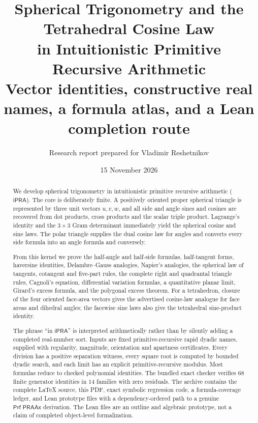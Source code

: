 \documentclass[11pt]{article}
\title{\textbf{Spherical Trigonometry and the Tetrahedral Cosine Law\\
       in Intuitionistic Primitive Recursive Arithmetic}\\[0.4em]
       \large Vector identities, constructive real names, a formula atlas, and a Lean completion route}
\author{Research report prepared for Vladimir Reshetnikov}
\date{15 November 2026}
\theoremstyle{definition}
\newcommand{\ipra}{\mathsf{iPRA}}
\newcommand{\PRAAx}{\mathsf{PRAAx}}
\newcommand{\Prf}{\mathsf{Prf}}
\begin{document}
\maketitle

\begin{abstract}
We develop spherical trigonometry in intuitionistic primitive recursive
arithmetic (\(\ipra\)).  The core is deliberately finite.  A positively oriented
proper spherical triangle is represented by three unit vectors \(u,v,w\), and
all side and angle sines and cosines are recovered from dot products, cross
products and the scalar triple product.  Lagrange's identity and the \(3\times3\)
Gram determinant immediately yield the spherical cosine and sine laws.  The
polar triangle supplies the dual cosine law for angles and converts every
side formula into an angle formula and conversely.

From this kernel we prove the half-angle and half-side formulas, half-tangent
forms, haversine identities, Delambre--Gauss analogies, Napier's analogies,
the spherical law of tangents, cotangent and five-part rules, the complete
right and quadrantal triangle rules, Cagnoli's equation, differential
variation formulas, a quantitative planar limit, Girard's excess formula,
and the polygonal excess theorem.  For a tetrahedron, closure of the four
oriented face-area vectors gives the advertised cosine-law analogue for face
areas and dihedral angles; the facewise sine laws also give the tetrahedral
sine-product identity.

The phrase ``in \(\ipra\)'' is interpreted arithmetically rather than by silently
adding a completed real-number sort.  Inputs are fixed primitive-recursive
rapid dyadic names, supplied with regularity, magnitude, orientation and
apartness certificates.  Every division has a positive separation witness,
every square root is computed by bounded dyadic search, and each limit has an
explicit primitive-recursive modulus.  Most formulas reduce to checked
polynomial identities.  The bundled exact checker verifies 68 finite generator
identities in 14 families with zero residuals.  The archive contains the complete \LaTeX{} source,
this PDF, exact symbolic regression code, a formula-coverage ledger, and Lean
prototype files with a dependency-ordered path to a genuine
\(\Prf\;\PRAAx\) derivation.  The Lean files are an outline and algebraic
prototype, not a claim of completed object-level formalization.
\end{abstract}

\tableofcontents
\end{document}
